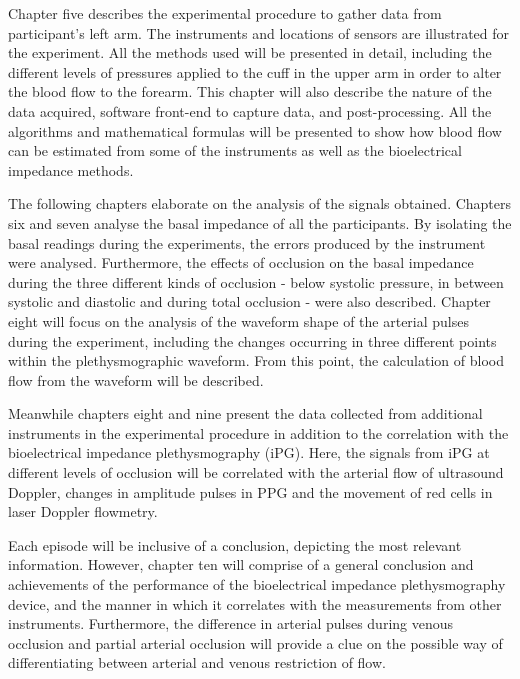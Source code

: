 Chapter five describes the experimental procedure to gather data from participant's left arm. The instruments and locations of sensors are illustrated for the experiment. All the methods used will be presented in detail, including the different levels of pressures applied to the cuff in the upper arm in order to alter the blood flow to the forearm. This chapter will also describe the nature of the data acquired, software front-end to capture data, and post-processing. All the algorithms and mathematical formulas will be presented to show how blood flow can be estimated from some of the instruments as well as the bioelectrical impedance methods.  

The following chapters elaborate on the analysis of the signals obtained. Chapters six and seven analyse the basal impedance of all the participants. By isolating the basal readings during the experiments, the errors produced by the instrument were analysed. Furthermore, the effects of occlusion on the basal impedance during the three different kinds of occlusion - below systolic pressure, in between systolic and diastolic and during total occlusion - were also described. Chapter eight will focus on the analysis of the waveform shape of the arterial pulses during the experiment, including the changes occurring in three different points within the plethysmographic waveform. From this point, the calculation of blood flow from the waveform will be described. 

Meanwhile chapters eight and nine present the data collected from additional instruments in the experimental procedure in addition to the correlation with the bioelectrical impedance plethysmography (iPG). Here, the signals from iPG at different levels of occlusion will be correlated with the arterial flow of ultrasound Doppler, changes in amplitude pulses in PPG and the movement of red cells in laser Doppler flowmetry. 

Each episode will be inclusive of a conclusion, depicting the most relevant information. However, chapter ten will comprise of a general conclusion and achievements of the performance of the bioelectrical impedance plethysmography device, and the manner in which it correlates with the measurements from other instruments. Furthermore, the difference in arterial pulses during venous occlusion and partial arterial occlusion will provide a clue on  the possible way of differentiating between arterial and venous restriction of flow.



 

